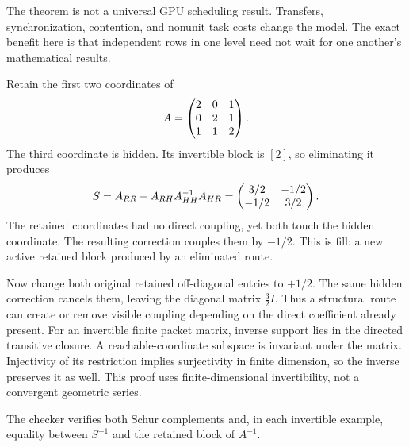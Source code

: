 The theorem is not a universal GPU scheduling result. Transfers, synchronization, contention, and nonunit task costs change the model. The exact benefit here is that independent rows in one level need not wait for one another's mathematical results.

Retain the first two coordinates of
\[
A=\begin{pmatrix}2&0&1\\0&2&1\\1&1&2\end{pmatrix}.
\]
The third coordinate is hidden. Its invertible block is $[2]$, so eliminating it produces
\[
S=A_{RR}-A_{RH}A_{HH}^{-1}A_{HR}
=\begin{pmatrix}3/2&-1/2\\-1/2&3/2\end{pmatrix}.
\]
The retained coordinates had no direct coupling, yet both touch the hidden coordinate. The resulting correction couples them by $-1/2$. This is fill: a new active retained block produced by an eliminated route.

Now change both original retained off-diagonal entries to $+1/2$. The same hidden correction cancels them, leaving the diagonal matrix $\frac32 I$. Thus a structural route can create or remove visible coupling depending on the direct coefficient already present.
For an invertible finite packet matrix, inverse support lies in the directed transitive closure. A reachable-coordinate subspace is invariant under the matrix. Injectivity of its restriction implies surjectivity in finite dimension, so the inverse preserves it as well. This proof uses finite-dimensional invertibility, not a convergent geometric series.

The checker verifies both Schur complements and, in each invertible example, equality between $S^{-1}$ and the retained block of $A^{-1}$.

